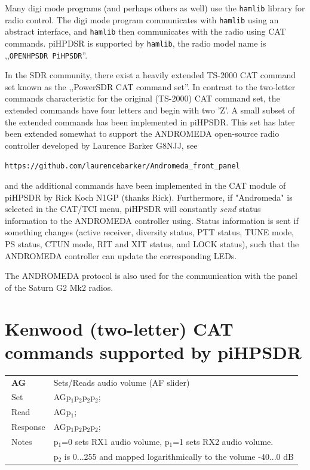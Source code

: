 \documentclass[12pt]{book}
\def\pH{pi\-HPSDR\xspace}
\begin{document}
Many digi mode programs (and perhaps others as well) use the \texttt{hamlib} library for radio control. The digi mode
program communicates with \texttt{hamlib} using an abstract interface, and \texttt{hamlib} then communicates with the radio
using CAT commands. piHPDSR is supported by \texttt{hamlib}, the radio model name is ,,\texttt{OPENHPSDR PiHPSDR}''.

In the SDR community, there exist a heavily extended TS-2000 CAT command set known as the ,,PowerSDR CAT
command set''. In contrast to the two-letter commands characteristic for the original (TS-2000) CAT
command set, the extended commands have four letters and begin with two 'Z'.
A small subset of the extended commands  has been implemented in \pH. This set has later been extended
somewhat to support the  ANDROMEDA open-source radio controller developed by Laurence Barker G8NJJ, see

\texttt{https://github.com/laurencebarker/Andromeda\_front\_panel}

and the additional commands have been implemented in
the CAT module of \pH by Rick Koch N1GP (thanks Rick).
 Furthermore, if "Andromeda" is selected in the CAT/TCI menu,
\pH will constantly
\textit{send} status information to the ANDROMEDA controller using. Status information is
sent if something
changes (active receiver,  diversity status, PTT status, TUNE mode, PS status, CTUN mode, RIT and XIT
status, and LOCK status),
such that the ANDROMEDA controller can update the corresponding LEDs.

The ANDROMEDA protocol is also used for the communication with the panel of the Saturn G2 Mk2 radios.


%
%



\section[Kenwood CAT commands]{Kenwood (two-letter) CAT commands supported by \pH}

\begin{center}
\begin{tabular}{|p{2cm}|p{11cm}|}
\toprule
$\phantom{\Big|}$\textbf{\large AG} & Sets/Reads audio volume (AF slider) \\\cline{1-2}
$\phantom{\Big|}${\large Set} & {AGp$_1$p$_2$p$_2$p$_2$;} \\\hline
$\phantom{\Big|}${\large Read} & {AGp$_1$;} \\\hline
$\phantom{\Big|}${\large Response} & {AGp$_1$p$_2$p$_2$p$_2$;} \\\hline
$\phantom{\Big|}${\large Notes} & \multicolumn{1}{|p{11cm}|}{p$_1$=0 sets RX1 audio volume, p$_1$=1 sets RX2 audio volume.} \\
 & \multicolumn{1}{|p{11cm}|}{p$_2$ is 0...255 and mapped logarithmically to the volume -40...0 dB} \\
\bottomrule
\end{tabular}
\end{center}
\end{document}
